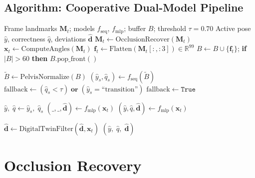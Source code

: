 \documentclass[conference]{IEEEtran}
\begin{document}
\subsection{Algorithm: Cooperative Dual-Model Pipeline}

\begin{algorithm}[ht]
\caption{Cooperative Dual-Model Inference Pipeline}
\label{alg:dual}
\begin{algorithmic}[1]
\Require Frame landmarks $\mathbf{M}_t$; models $f_{\mathrm{seq}}$,
  $f_{\mathrm{mlp}}$; buffer $B$; threshold $\tau=0.70$
\Ensure Active pose $\hat{y}$, correctness $\hat{q}$, deviations $\hat{\mathbf{d}}$
\State $\mathbf{M}_t \leftarrow \mathrm{OcclusionRecover}(\mathbf{M}_t)$
\State $\mathbf{x}_t \leftarrow \mathrm{ComputeAngles}(\mathbf{M}_t)$
\State $\mathbf{f}_t \leftarrow \mathrm{Flatten}(\mathbf{M}_t[:,{:}3]) \in \mathbb{R}^{99}$
\State $B \leftarrow B \cup \{\mathbf{f}_t\}$;\quad
  \textbf{if} $|B| > 60$ \textbf{then} $B.\mathrm{pop\_front}()$

  \State $\tilde{B} \leftarrow \mathrm{PelvisNormalize}(B)$
  \State $(\hat{y}_s, \hat{q}_s) \leftarrow f_{\mathrm{seq}}(\tilde{B})$
  \State $\mathrm{fallback} \leftarrow (\hat{q}_s < \tau) \;\mathbf{or}\; (\hat{y}_s = \text{``transition''})$
\Else
  \State $\mathrm{fallback} \leftarrow \mathtt{True}$
\EndIf

  \State $\hat{y},\; \hat{q} \leftarrow \hat{y}_s,\; \hat{q}_s$
  \State $(\_, \_, \hat{\mathbf{d}}) \leftarrow f_{\mathrm{mlp}}(\mathbf{x}_t)$
\Else
  \State $(\hat{y}, \hat{q}, \hat{\mathbf{d}}) \leftarrow f_{\mathrm{mlp}}(\mathbf{x}_t)$
\EndIf

\State $\hat{\mathbf{d}} \leftarrow \mathrm{DigitalTwinFilter}(\hat{\mathbf{d}},\mathbf{x}_t)$
\State \Return $(\hat{y},\; \hat{q},\; \hat{\mathbf{d}})$
\end{algorithmic}
\end{algorithm}

\section{Occlusion Recovery}
\label{sec:occlusion}
\end{document}
